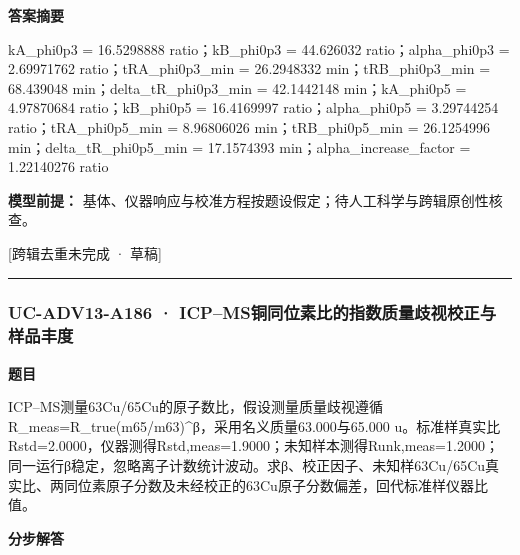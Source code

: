 \documentclass[UTF8,11pt,a4paper]{ctexart}
\begin{document}
\noindent\textbf{答案摘要}\par
kA\_phi0p3 = 16.5298888 ratio；kB\_phi0p3 = 44.626032 ratio；alpha\_phi0p3 = 2.69971762 ratio；tRA\_phi0p3\_min = 26.2948332 min；tRB\_phi0p3\_min = 68.439048 min；delta\_tR\_phi0p3\_min = 42.1442148 min；kA\_phi0p5 = 4.97870684 ratio；kB\_phi0p5 = 16.4169997 ratio；alpha\_phi0p5 = 3.29744254 ratio；tRA\_phi0p5\_min = 8.96806026 min；tRB\_phi0p5\_min = 26.1254996 min；delta\_tR\_phi0p5\_min = 17.1574393 min；alpha\_increase\_factor = 1.22140276 ratio\par
\noindent\textbf{模型前提：}
基体、仪器响应与校准方程按题设假定；待人工科学与跨辑原创性核查。\par
\noindent\textcolor{red!65!black}{[跨辑去重未完成 · 草稿]} \par
\medskip\hrule\medskip
{}
\subsubsection*{UC-ADV13-A186 · ICP–MS铜同位素比的指数质量歧视校正与样品丰度}
\noindent\textbf{题目}\par
ICP–MS测量63Cu/65Cu的原子数比，假设测量质量歧视遵循R\_meas=R\_true(m65/m63)\textasciicircum{}β，采用名义质量63.000与65.000 u。标准样真实比Rstd=2.0000，仪器测得Rstd,meas=1.9000；未知样本测得Runk,meas=1.2000；同一运行β稳定，忽略离子计数统计波动。求β、校正因子、未知样63Cu/65Cu真实比、两同位素原子分数及未经校正的63Cu原子分数偏差，回代标准样仪器比值。\par
\medskip\noindent\textbf{分步解答}
\end{document}
